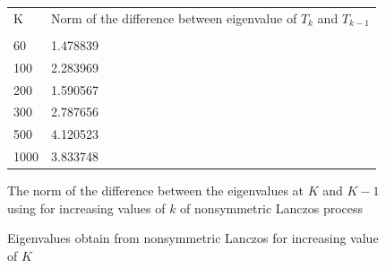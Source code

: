 \begin{enumerate}
\begin{figure}[!tbh]
 \centering    
\begin{tabular}{ |p{1cm}|| p{10cm}|}
\hline
 K & Norm of the difference between eigenvalue of $T_{k}$  and $T_{k-1}$\\ \hhline{|=|=|}   
\hline
20 & \\
\hline  
60&	1.478839\\       
\hline  
100&	2.283969 \\       
\hline  
200&	1.590567 \\       
\hline  
300&	2.787656\\       
\hline  
500&	4.120523 \\       
\hline  
1000&	3.833748 \\       
\hline  
\end{tabular} 
\caption{The norm of the difference between the eigenvalues at $K$ and $K-1$ using for increasing values of $k$ of nonsymmetric Lanczos process}
   \label{tab:err}
\end{figure} 


\begin{figure}[!tbh]
\centering        
   
   \caption{Eigenvalues obtain from nonsymmetric Lanczos for increasing value of $K$}
   \label{fig:cc}
\end{figure}


\end{enumerate}